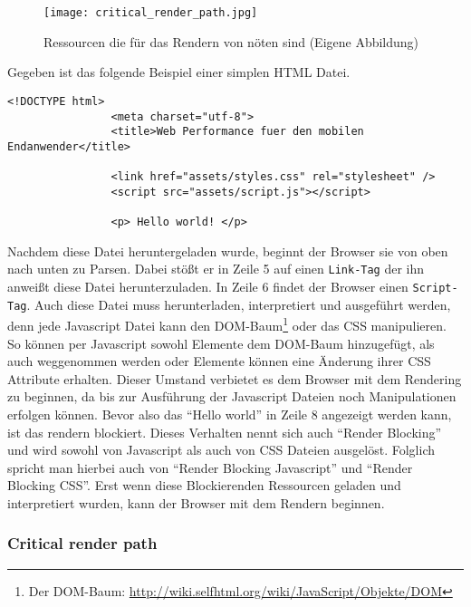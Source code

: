 			\begin{figure}[htbp]
				\begin{center}
					\texttt{[image: critical\_render\_path.jpg]}
					\caption{Ressourcen die für das Rendern von nöten sind (Eigene Abbildung)}
					\label{fig:critical_render_path}
				\end{center}
			\end{figure}

			\pagebreak

			Gegeben ist das folgende Beispiel einer simplen HTML Datei.

			\begin{lstlisting}[captionpos=b, caption=Beispiel Code, label=beispielCode]
				<!DOCTYPE html>
				<meta charset="utf-8">
				<title>Web Performance fuer den mobilen Endanwender</title>

				<link href="assets/styles.css" rel="stylesheet" />
				<script src="assets/script.js"></script>

				<p> Hello world! </p>

			\end{lstlisting}

			Nachdem diese Datei heruntergeladen wurde, beginnt der Browser sie von oben nach unten zu Parsen. Dabei stößt er in Zeile 5 auf einen \texttt{Link-Tag} der ihn anweißt diese Datei herunterzuladen. In Zeile 6 findet der Browser einen \texttt{Script-Tag}. Auch diese Datei muss herunterladen, interpretiert und ausgeführt werden, denn jede Javascript Datei kann den DOM-Baum\footnote{Der DOM-Baum: \url{http://wiki.selfhtml.org/wiki/JavaScript/Objekte/DOM}} oder das CSS manipulieren. So können per Javascript sowohl Elemente dem DOM-Baum hinzugefügt, als auch weggenommen werden oder Elemente können eine Änderung ihrer CSS Attribute erhalten. Dieser Umstand verbietet es dem Browser mit dem Rendering zu beginnen, da bis zur Ausführung der Javascript Dateien noch Manipulationen erfolgen können.
			Bevor also das "`Hello world"' in Zeile 8 angezeigt werden kann, ist das rendern blockiert. Dieses Verhalten nennt sich auch "`Render Blocking"' und wird sowohl von Javascript als auch von CSS Dateien ausgelöst. Folglich spricht man hierbei auch von "`Render Blocking Javascript"' und "`Render Blocking CSS"'. Erst wenn diese Blockierenden Ressourcen geladen und interpretiert wurden, kann der Browser mit dem Rendern beginnen. 


		\subsubsection{Critical render path} %
		\label{ssub:critical_render_path}
			

